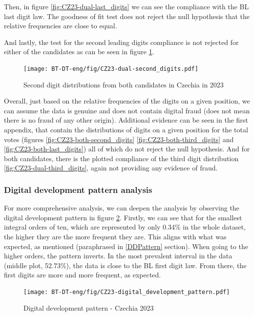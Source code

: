  

Then, in figure \ref{fig:CZ23-dual-last_digits} we can see the compliance with the BL last digit law. The goodness of fit test does not reject the null hypothesis that the relative frequencies are close to equal. 

And lastly, the test for the second leading digits compliance is not rejected for either of the candidates as can be seen in figure \ref{fig:CZ23-dual-second_digits}. 

\begin{figure}[h]
    \centering
    \caption{Second digit distributions from both candidates in Czechia in 2023}
    \texttt{[image: BT-DT-eng/fig/CZ23-dual-second\_digits.pdf]}
    \label{fig:CZ23-dual-second_digits}
\end{figure}

Overall, just based on the relative frequencies of the digits on a given position, we can assume the data is genuine and does not contain digital fraud (does not mean there is no fraud of any other origin). Additional evidence can be seen in the first appendix, that contain the distributions of digits on a given position for the total votes (figures \ref{fig:CZ23-both-second_digits} \ref{fig:CZ23-both-third_digits} and \ref{fig:CZ23-both-last_digits}) all of which do not reject the null hypothesis. And for both candidates, there is the plotted compliance of the third digit distribution \ref{fig:CZ23-dual-third_digits}, again not providing any evidence of fraud. 

\subsubsection{Digital development pattern analysis}

For more comprehensive analysis, we can deepen the analysis by observing the digital development pattern in figure \ref{fig:CZ23-digital_development_pattern}. Firstly, we can see that for the smallest integral orders of ten, which are represented by only 0.34\% in the whole dataset, the higher they are the more frequent they are. This aligns with what was expected, as \citeauthor{kossovsky2014benford} mentioned (paraphrased in  \ref{DDPattern} section). When going to the higher orders, the pattern inverts. In the most prevalent interval in the data (middle plot, 52.73\%), the data is close to the BL first digit law. From there, the first digits are more and more frequent, as expected. 

\begin{figure}[h]
    \centering
    \caption{Digital development pattern - Czechia 2023}
    \texttt{[image: BT-DT-eng/fig/CZ23-digital\_development\_pattern.pdf]}
    \label{fig:CZ23-digital_development_pattern}
\end{figure}

